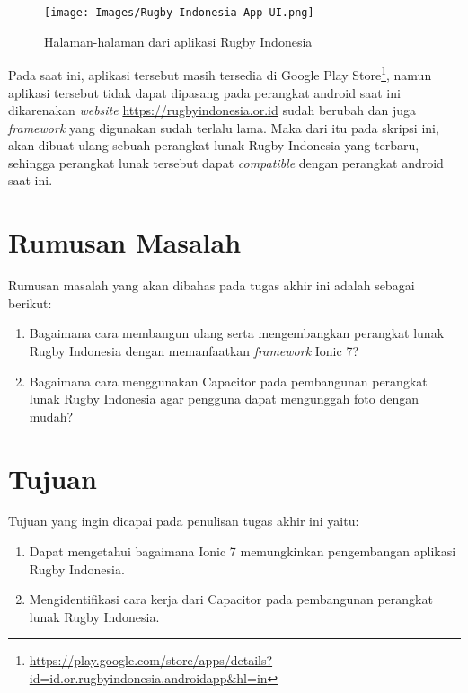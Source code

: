 \documentclass[a4paper,twoside]{article}
\begin{document}
\begin{figure} [H]
    \centering
    \texttt{[image: Images/Rugby-Indonesia-App-UI.png]}
    \caption[Halaman aplikasi Rugby Indonesia]{Halaman-halaman dari aplikasi Rugby Indonesia}
    \label{fig:rugby-halaman-label}
\end{figure}

Pada saat ini, aplikasi tersebut masih tersedia di Google Play Store\footnote{\url{https://play.google.com/store/apps/details?id=id.or.rugbyindonesia.androidapp\&hl=in}}, namun aplikasi tersebut tidak dapat dipasang pada perangkat android saat ini dikarenakan \textit{website} \url{https://rugbyindonesia.or.id} sudah berubah dan juga \textit{framework} yang digunakan sudah terlalu lama. Maka dari itu pada skripsi ini, akan dibuat ulang sebuah perangkat lunak Rugby Indonesia yang terbaru, sehingga perangkat lunak tersebut dapat \textit{compatible} dengan perangkat android saat ini.

\section{Rumusan Masalah}
Rumusan masalah yang akan dibahas pada tugas akhir ini adalah sebagai berikut:
\begin{enumerate}
    \item Bagaimana cara membangun ulang serta mengembangkan perangkat lunak Rugby Indonesia dengan memanfaatkan \textit{framework} Ionic 7?
    \item Bagaimana cara menggunakan Capacitor pada pembangunan perangkat lunak Rugby Indonesia agar pengguna dapat mengunggah foto dengan mudah?
\end{enumerate}

\section{Tujuan}
Tujuan yang ingin dicapai pada penulisan tugas akhir ini yaitu:
\begin{enumerate}
    \item Dapat mengetahui bagaimana Ionic 7 memungkinkan pengembangan aplikasi Rugby Indonesia.
    \item Mengidentifikasi cara kerja dari Capacitor pada pembangunan perangkat lunak Rugby Indonesia.
\end{enumerate}
\end{document}
